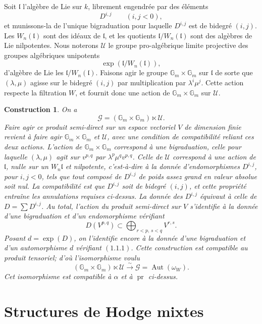 \documentclass[11pt]{article}
\newtheorem{construction}{Construction}[section]
\newcommand{\Aut}{\operatorname{Aut}}
\newcommand{\Gm}{\mathbb G_m}
\begin{document}
Soit \(\mathfrak l\) l'algèbre de Lie sur \(k\), librement engendrée par des éléments
\[
 D^{i,j}\qquad (i,j<0),
\]
et munissons-la de l'unique bigraduation pour laquelle \(D^{i,j}\) est de bidegré \((i,j)\). Les \(W_n(\mathfrak l)\) sont des idéaux de \(\mathfrak l\), et les quotients \(\mathfrak l/W_n(\mathfrak l)\) sont des algèbres de Lie nilpotentes. Nous noterons \(\mathcal U\) le groupe pro-algébrique limite projective des groupes algébriques unipotents
\[
 \exp(\mathfrak l/W_n(\mathfrak l)),
\]
d'algèbre de Lie les \(\mathfrak l/W_n(\mathfrak l)\). Faisons agir le groupe \(\Gm\times\Gm\) sur \(\mathfrak l\) de sorte que \((\lambda,\mu)\) agisse sur le bidegré \((i,j)\) par multiplication par \(\lambda^i\mu^j\). Cette action respecte la filtration \(W\), et fournit donc une action de \(\Gm\times\Gm\) sur \(\mathcal U\).

\begin{construction}
On a
\[
 \mathcal G=(\Gm\times\Gm)\ltimes\mathcal U.
\]
Faire agir ce produit semi-direct sur un espace vectoriel \(V\) de dimension finie revient à faire agir \(\Gm\times\Gm\) et \(\mathcal U\), avec une condition de compatibilité reliant ces deux actions. L'action de \(\Gm\times\Gm\) correspond à une bigraduation, celle pour laquelle \((\lambda,\mu)\) agit sur \(v^{p,q}\) par \(\lambda^p\mu^qv^{p,q}\). Celle de \(\mathcal U\) correspond à une action de \(\mathfrak l\), nulle sur un \(W_n\mathfrak l\) et nilpotente, c'est-à-dire à la donnée d'endomorphismes \(D^{i,j}\), pour \(i,j<0\), tels que tout composé de \(D^{i,j}\) de poids assez grand en valeur absolue soit nul. La compatibilité est que \(D^{i,j}\) soit de bidegré \((i,j)\), et cette propriété entraîne les annulations requises ci-dessus. La donnée des \(D^{i,j}\) équivaut à celle de \(D=\sum D^{i,j}\). Au total, l'action du produit semi-direct sur \(V\) s'identifie à la donnée d'une bigraduation et d'un endomorphisme vérifiant
\[
 D(V^{p,q})\subset\bigoplus_{r<p,\,s<q}V^{r,s}.
\]
Posant \(d=\exp(D)\), on l'identifie encore à la donnée d'une bigraduation et d'un automorphisme \(d\) vérifiant \((1.1.1)\). Cette construction est compatible au produit tensoriel; d'où l'isomorphisme voulu
\[
 (\Gm\times\Gm)\ltimes\mathcal U\xrightarrow{\sim}\mathcal G=\Aut(\omega_W).
\]
Cet isomorphisme est compatible à \(\alpha\) et à \(\operatorname{pr}\) ci-dessus.
\end{construction}


\section{Structures de Hodge mixtes}
\end{document}
